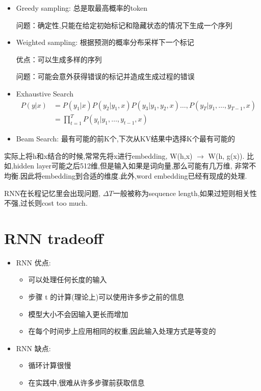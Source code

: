 	\begin{itemize}
		\item Greedy sampling: 总是取最高概率的token
		
		问题：确定性,只能在给定初始标记和隐藏状态的情况下生成一个序列

		\item Weighted sampling: 根据预测的概率分布采样下一个标记
		
		优点：可以生成多样的序列
		
		问题：可能会意外获得错误的标记并造成生成过程的错误
		
		\item Exhaustive Search
		\[
		\begin{aligned}P(y|x)&=P(y_1|x)P(y_2|y_1,x)P(y_3|y_1,y_2,x)\ldots,P(y_T|y_1,\ldots,y_{T-1},x)\\&=\prod_{t=1}^TP(y_t|y_1,\ldots,y_{t-1},x)\end{aligned}
		\]

		\item Beam Search: 最有可能的前K个,下次从KV结果中选择K个最有可能的
	\end{itemize}
	
	实际上将h和x结合的时候,常常先将x进行embedding, W(h,x) $\rightarrow$ W(h, g(x)).
	比如,hidden layer可能之后512维,但是输入如果是词向量,那么可能有几万维,
	非常不均衡.因此将embedding到合适的维度.此外,word embedding已经有现成的处理.
	
	RNN在长程记忆里会出现问题, $\Delta T$一般被称为sequence length,如果过短则相关性不强,过长则cost too much.
	
	\section{RNN tradeoff}
	\begin{itemize}
		\item RNN 优点:
		\begin {itemize}
			\item 可以处理任何长度的输入
			\item 步骤 t 的计算(理论上)可以使用许多步之前的信息
			\item 模型大小不会因输入更长而增加
			\item 在每个时间步上应用相同的权重,因此输入处理方式是等变的
		\end{itemize}
		\item RNN 缺点:
		\begin{itemize}
			\item 循环计算很慢
			\item 在实践中,很难从许多步骤前获取信息
		\end{itemize}
	\end{itemize}

